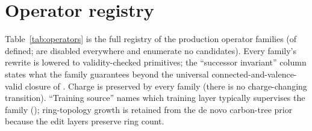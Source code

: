 \section{Operator registry}
\label{app:operators}

Table~\ref{tab:operators} is the full registry of the  production
operator families (of  defined;  are
disabled everywhere and enumerate no candidates). Every family's rewrite is lowered to validity-checked
primitives; the ``successor invariant'' column states what the family guarantees beyond the universal
connected-and-valence-valid closure of . Charge is preserved by every family (there is
no charge-changing transition). ``Training source'' names which training layer typically supervises the
family (); ring-topology growth is retained from the de novo carbon-tree prior because the
edit layers preserve ring count.

